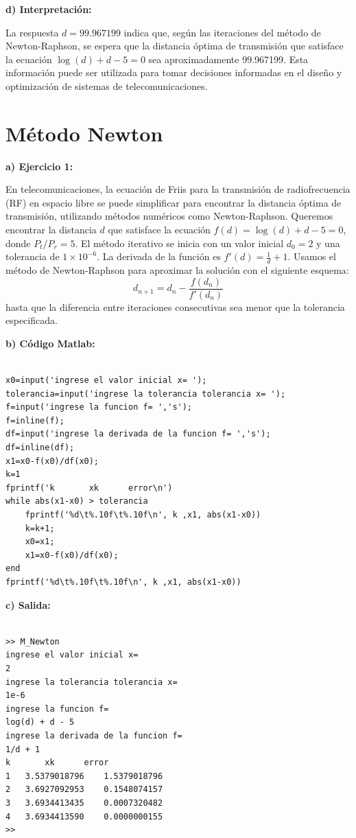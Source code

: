 \documentclass[12pt,a4paper,twoside]{article}  %
\begin{document}
\textbf{d) Interpretación:}

La respuesta \(d = 99.967199\) indica que, según las iteraciones del método de Newton-Raphson, se espera que la distancia óptima de transmisión que satisface la ecuación \( \log(d) + d - 5 = 0 \) sea aproximadamente 99.967199. Esta información puede ser utilizada para tomar decisiones informadas en el diseño y optimización de sistemas de telecomunicaciones.



\section{Método Newton}

\textbf{a) Ejercicio 1: }

En telecomunicaciones, la ecuación de Friis para la transmisión de radiofrecuencia (RF) en espacio libre se puede simplificar para encontrar la distancia óptima de transmisión, utilizando métodos numéricos como Newton-Raphson. Queremos encontrar la distancia \( d \) que satisface la ecuación \( f(d) = \log(d) + d - 5 = 0 \), donde \( P_t/P_r = 5 \). El método iterativo se inicia con un valor inicial \( d_0 = 2 \) y una tolerancia de \( 1 \times 10^{-6} \). La derivada de la función es \( f'(d) = \frac{1}{d} + 1 \). Usamos el método de Newton-Raphson para aproximar la solución con el siguiente esquema: 
\[
d_{n+1} = d_n - \frac{f(d_n)}{f'(d_n)}
\]
hasta que la diferencia entre iteraciones consecutivas sea menor que la tolerancia especificada.


\textbf{b) Código Matlab:}

\begin{lstlisting}

x0=input('ingrese el valor inicial x= ');
tolerancia=input('ingrese la tolerancia tolerancia x= ');
f=input('ingrese la funcion f= ','s');
f=inline(f);
df=input('ingrese la derivada de la funcion f= ','s');
df=inline(df);
x1=x0-f(x0)/df(x0);
k=1
fprintf('k       xk      error\n')
while abs(x1-x0) > tolerancia
    fprintf('%d\t%.10f\t%.10f\n', k ,x1, abs(x1-x0))
    k=k+1;
    x0=x1;
    x1=x0-f(x0)/df(x0);
end
fprintf('%d\t%.10f\t%.10f\n', k ,x1, abs(x1-x0))

\end{lstlisting}

\textbf{c) Salida:}

\begin{verbatim}

>> M_Newton
ingrese el valor inicial x= 
2
ingrese la tolerancia tolerancia x= 
1e-6
ingrese la funcion f= 
log(d) + d - 5
ingrese la derivada de la funcion f= 
1/d + 1
k       xk      error
1	3.5379018796	1.5379018796
2	3.6927092953	0.1548074157
3	3.6934413435	0.0007320482
4	3.6934413590	0.0000000155
>> 

\end{verbatim}
\end{document}
